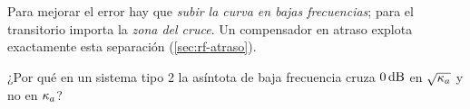 
\begin{ideaclave}
Para mejorar el error hay que \emph{subir la curva en bajas frecuencias}; para el transitorio importa la \emph{zona del cruce}. Un compensador en atraso explota exactamente esta separación (\cref{sec:rf-atraso}).
\end{ideaclave}

\begin{pausa}
¿Por qué en un sistema tipo 2 la asíntota de baja frecuencia cruza $0\,\mathrm{dB}$ en $\sqrt{\kappa_a}$ y no en $\kappa_a$?
\end{pausa}
